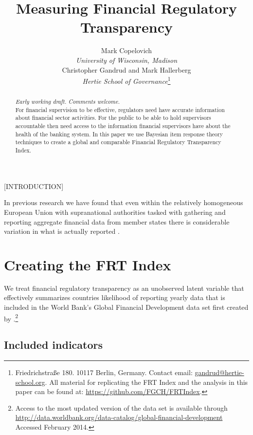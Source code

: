 \documentclass[a4paper]{article}
\title{Measuring Financial Regulatory Transparency}
\author{Mark Copelovich \\ \emph{University of Wisconsin, Madison} \\[0.5cm] Christopher Gandrud and Mark Hallerberg \\ 
    {\emph{Hertie School of Governance}}\footnote{Friedrichstra{\ss}e 180. 10117 Berlin, Germany. Contact email: \href{mailto:gandrud@hertie-school.org}{gandrud@hertie-school.org}. All material for replicating the FRT Index and the analysis in this paper can be found at: \url{https://github.com/FGCH/FRTIndex}.}}
\begin{document}
\maketitle

\begin{abstract}
\noindent \emph{Early working draft. Comments welcome.} \\
For financial supervision to be effective, regulators need have accurate information about financial sector activities. For the public to be able to hold supervisors accountable then need access to the information financial supervisors have about the health of the banking system. In this paper we use Bayesian item response theory techniques to create a global and comparable Financial Regulatory Transparency Index.  
\end{abstract}

[INTRODUCTION]

In previous research we have found that even within the relatively homogeneous European Union with supranational authorities tasked with gathering and reporting aggregate financial data from member states there is considerable variation in what is actually reported \cite[see][]{Gandrud2014a}.  

\section{Creating the FRT Index}

We treat financial regulatory transparency as an unobserved latent variable that effectively summarizes countries likelihood of reporting yearly data that is included in the World Bank's Global Financial Development data set first created by \cite{Cihak2012}.\footnote{Access to the most updated version of the data set is available through \url{http://data.worldbank.org/data-catalog/global-financial-development} Accessed February 2014.}

\subsection{Included indicators}
\end{document}
